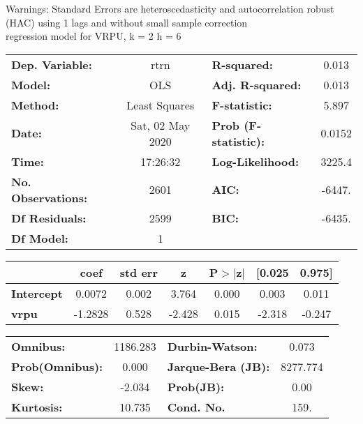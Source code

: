 Warnings: \newline
 [1] Standard Errors are heteroscedasticity and autocorrelation robust (HAC) using 1 lags and without small sample correction\\ 

regression model for VRPU, k = 2 h = 6\begin{center}
\begin{tabular}{lclc}
\toprule
\textbf{Dep. Variable:}    &       rtrn       & \textbf{  R-squared:         } &     0.013   \\
\textbf{Model:}            &       OLS        & \textbf{  Adj. R-squared:    } &     0.013   \\
\textbf{Method:}           &  Least Squares   & \textbf{  F-statistic:       } &     5.897   \\
\textbf{Date:}             & Sat, 02 May 2020 & \textbf{  Prob (F-statistic):} &   0.0152    \\
\textbf{Time:}             &     17:26:32     & \textbf{  Log-Likelihood:    } &    3225.4   \\
\textbf{No. Observations:} &        2601      & \textbf{  AIC:               } &    -6447.   \\
\textbf{Df Residuals:}     &        2599      & \textbf{  BIC:               } &    -6435.   \\
\textbf{Df Model:}         &           1      & \textbf{                     } &             \\
\bottomrule
\end{tabular}
\begin{tabular}{lcccccc}
                   & \textbf{coef} & \textbf{std err} & \textbf{z} & \textbf{P$> |$z$|$} & \textbf{[0.025} & \textbf{0.975]}  \\
\midrule
\textbf{Intercept} &       0.0072  &        0.002     &     3.764  &         0.000        &        0.003    &        0.011     \\
\textbf{vrpu}      &      -1.2828  &        0.528     &    -2.428  &         0.015        &       -2.318    &       -0.247     \\
\bottomrule
\end{tabular}
\begin{tabular}{lclc}
\textbf{Omnibus:}       & 1186.283 & \textbf{  Durbin-Watson:     } &    0.073  \\
\textbf{Prob(Omnibus):} &   0.000  & \textbf{  Jarque-Bera (JB):  } & 8277.774  \\
\textbf{Skew:}          &  -2.034  & \textbf{  Prob(JB):          } &     0.00  \\
\textbf{Kurtosis:}      &  10.735  & \textbf{  Cond. No.          } &     159.  \\
\bottomrule
\end{tabular}
\end{center}

